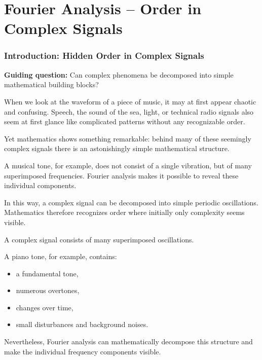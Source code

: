 \chapter{Fourier Analysis -- Order in Complex Signals}
\label{chap:fourieranalyse}

\subsection{Introduction: Hidden Order in Complex Signals}

\textbf{Guiding question:}
Can complex phenomena be decomposed into simple mathematical building blocks?

\medskip

When we look at the waveform of a piece of music,
it may at first appear chaotic and confusing.
Speech,
the sound of the sea,
light,
or technical radio signals also seem at first glance
like complicated patterns without any recognizable order.

Yet mathematics shows something remarkable:
behind many of these seemingly complex signals
there is an astonishingly simple mathematical structure.

A musical tone, for example, does not consist of a single vibration,
but of many superimposed frequencies.
Fourier analysis makes it possible
to reveal these individual components.

In this way, a complex signal
can be decomposed into simple periodic oscillations.
Mathematics therefore recognizes order
where initially only complexity seems visible.

\begin{DidacticBox}
	\small
	\label{box:fourier-komplexes-signal}
	A complex signal consists of many superimposed oscillations.
	
	A piano tone, for example, contains:
	
	\begin{itemize}
		\item a fundamental tone,
		\item numerous overtones,
		\item changes over time,
		\item small disturbances and background noises.
	\end{itemize}
	
	Nevertheless, Fourier analysis can mathematically decompose this structure
	and make the individual frequency components visible.
\end{DidacticBox}

